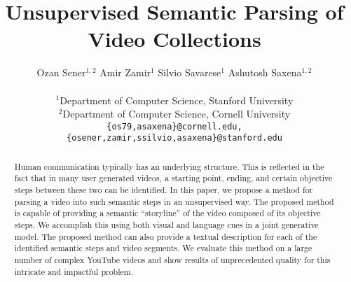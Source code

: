 \documentclass[10pt,twocolumn,letterpaper]{article}
\begin{document}
\title{Unsupervised Semantic Parsing of Video Collections}



\author{ Ozan Sener$^{1,2}$ \;\; Amir Zamir$^{1}$ \;\; Silvio Savarese$^{1}$ \;\; Ashutosh Saxena$^{1,2}$  \\ \\
$^1$Department of Computer Science, Stanford University\\
$^2$Department of Computer Science, Cornell University\\
{\tt\small \{os79,asaxena\}@cornell.edu, \{osener,zamir,ssilvio,asaxena\}@stanford.edu}
}
\maketitle


\begin{abstract}
Human communication typically has an underlying structure. This is reflected in the fact that in many user generated videos, a starting point, ending, and certain objective steps between these two can be identified. In this paper, we propose a method for parsing a video into such semantic steps in an unsupervised way. The proposed method is capable of providing a semantic ``storyline'' of the video composed of its objective steps. We accomplish this using both visual and language cues in a joint generative model. The proposed method can also provide a textual description for each of the identified semantic steps and video segments. We evaluate this method on a large number of complex YouTube videos and show results of unprecedented quality for this intricate and impactful problem.
\end{abstract}
\vspace{-5mm}







%
\end{document}
